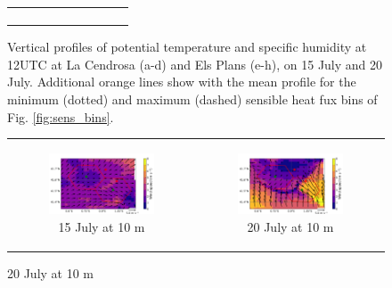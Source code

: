\begin{figure}[hbtp]
{\begin{tabular}{@{}cccc@{}}
\begin{subfigure}[t]{0.29\textwidth}
        \end{subfigure} \\
    \end{tabular}
    }
    \caption{Vertical profiles of potential temperature and specific humidity at 12UTC at La Cendrosa (a-d) and Els Plans (e-h), on 15 July and 20 July. Additional orange lines show with the mean profile for the minimum (dotted) and maximum (dashed) sensible heat fux bins of Fig. \ref{fig:sens_bins}.}
    \label{fig:profiles_theta_ovap_sensbins}
\end{figure}

\begin{figure}[hbtp]
    \centering
    \begin{tabular}{cc}
        \begin{subfigure}[t]{0.5\textwidth}
            \caption{15 July at 10 m}
            \includegraphics[width=\textwidth]{images/chap5/IOP_maps/mesoNH_wind_10m_2021-07-15T12:00:00.png}
        \end{subfigure} &
        \begin{subfigure}[t]{0.5\textwidth}
            \caption{20 July at 10 m}
            \includegraphics[width=\textwidth]{images/chap5/IOP_maps/mesoNH_wind_10m_2021-07-20T12:00:00.png}

\end{subfigure}
\end{tabular}
\end{figure}
